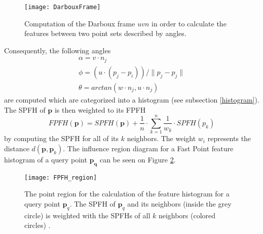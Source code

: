 \begin{figure}[H]
	\centering
	\texttt{[image: DarbouxFrame]}
	\caption{Computation of the Darboux frame $uvn$ in order to calculate the features between two point sets described by angles.}
	\label{fig:darbouxFrame}
\end{figure}

Consequently, the following angles
\begin{equation}
\begin{split}
\alpha = v \cdot n_j
\\
\phi = (u \cdot (p_j - p_i))/\|p_j - p_j\|
\\
\theta = arctan(w \cdot n_j, u \cdot n_j)
\end{split}
\label{eq:AngularVariations}
\end{equation}
are computed which are categorized into a histogram (see subsection \ref{histogram}). The SPFH of $\boldsymbol{p}$ is then weighted to its FPFH
\begin{equation}
FPFH(\boldsymbol{p}) = SPFH(\boldsymbol{p}) + \frac{1}{n} \cdot \displaystyle\sum_{k=1}^{n}\frac{1}{w_k} \cdot SPFH(p_k)
\end{equation}
by computing the SPFH for all of its $k$ neighbors. The weight $w_i$ represents the distance $d(\boldsymbol{p},\boldsymbol{p}_k)$. The influence region diagram for a Fast Point feature histogram of a query point $\boldsymbol{p_q}$ can be seen on Figure \ref{fig:FPFHregion}. 
\begin{figure}[H]
	\centering
	\texttt{[image: FPFH\_region]}
	\caption{The point region for the calculation of the feature histogram for a query point $\boldsymbol{p}_q$. The SPFH of $\boldsymbol{p}_q$ and its neighbors (inside the grey circle) is weighted with the SPFHs of all $k$ neighbors (colored circles) \cite{FPFH}.}
	\label{fig:FPFHregion}
\end{figure}
